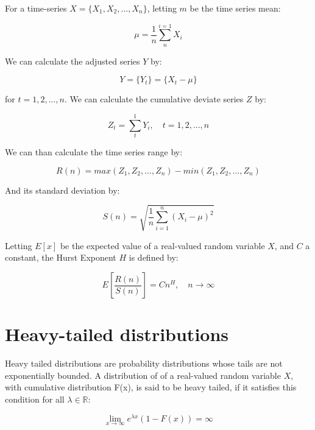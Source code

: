 For a time-series $X = \{ X_1, X_2, ..., X_n \}$, letting $m$ be the time series mean:

\begin{equation}
\mu = \frac{1}{n}\sum_{n}^{i=1}X_i
\end{equation}


We can calculate the adjusted series $Y$ by:

\begin{equation}
Y = \{ Y_t \} = \{ X_t - \mu \}
\end{equation}

for $t = 1, 2, ..., n $. We can calculate the  cumulative deviate series $Z$ by:


\begin{equation}
Z_t = \sum_{t}^{1}Y_i, \quad t = 1, 2, ..., n 
\end{equation}

We can than calculate the time series range by:

\begin{equation}
R(n) = max(Z_1, Z_2, ..., Z_n) - min(Z_1, Z_2, ..., Z_n)
\end{equation}

And its standard deviation by:

\begin{equation}
S(n) = \sqrt{\frac{1}{n}\sum_{i=1}^{n}(X_i -  \mu)^{2}}
\end{equation}


Letting $E[x]$ be the expected value of a real-valued random variable  $X$, and $C$ a constant, the Hurst Exponent $H$ is defined by\cite{hurst-def}:

\begin{equation}
E\left [  \frac{R(n)}{S(n)} \right ] = Cn^{H}, \quad n \to \infty 
\end{equation}



\section{Heavy-tailed distributions}

Heavy tailed distributions are probability distributions whose tails are not exponentially bounded.  A distribution of of a real-valued random variable $X$, with cumulative distribution F(x), is said to be heavy tailed, if it satisfies this condition for all $\lambda \in \mathbb{R}$:

\begin{equation}
	\lim_{x\to\infty} e^{\lambda x} (1 - F(x)) = \infty
\end{equation}



